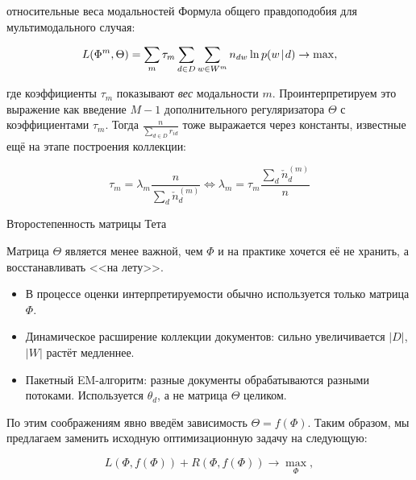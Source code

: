 \begin{frame}{относительные веса модальностей}
Формула общего правдоподобия для мультимодального случая:

\[
L(\Phi^m, \Theta) = \sum_m \tau_m \sum_{d\in D} \sum_{w \in W^m} n_{dw} \ln p(w \mspace{2mu}{|}\mspace{2mu} d) \rightarrow \max, 
\]

где коэффициенты $\tau_m$ показывают \textit{вес} модальности $m$. Проинтерпретируем это выражение как введение $M-1$ дополнительного регуляризатора $\Theta$ с коэффициентами $\tau_m$. Тогда $\frac{n}{\sum_{d\in D} r_{id}}$ тоже выражается через константы, известные ещё на этапе построения коллекции:

\[
\tau_m = \lambda_m \frac{n}{\sum_d \check{n}_d^{(m)}} \iff
\lambda_m = \tau_m \frac{\sum_d \check{n}_d^{(m)}}{n}
\]

\end{frame}


\begin{frame}{Второстепенность матрицы Тета}

Матрица $\Theta$ является менее важной, чем $\Phi$ и на практике хочется её не хранить, а восстанавливать <<на лету>>.

\begin{itemize}
\item В процессе оценки интерпретируемости обычно используется только матрица $\Phi$.

\item Динамическое расширение коллекции документов: сильно увеличивается $|D|$, $|W|$ растёт медленнее.

\item Пакетный EM-алгоритм: разные документы обрабатываются разными потоками. Используется $\theta_d$, а не матрица $\Theta$ целиком.
\end{itemize}

\bigskip
По этим соображениям явно введём зависимость $\Theta = f(\Phi)$. Таким образом, мы предлагаем заменить исходную оптимизационную задачу на следующую:

\begin{equation} \label{eq:tEM}
L(\Phi, f(\Phi) ) + R(\Phi, f(\Phi) ) \to \max_{\Phi},
\end{equation}
\end{frame}

